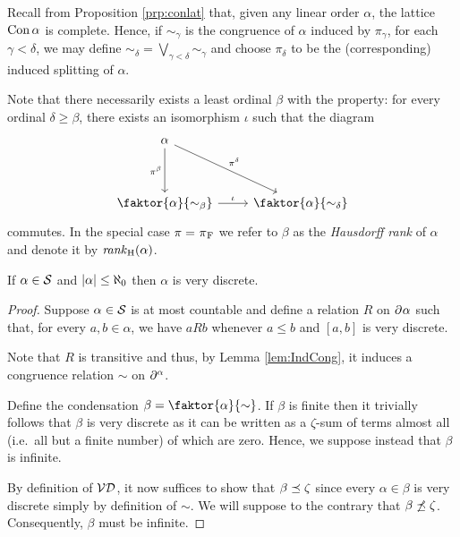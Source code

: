 Recall from Proposition \ref{prp:conlat} that, given any linear order $\alpha$,
the lattice $\operatorname{Con}\alpha$ is complete.  Hence, if $\sim_\gamma$ is the congruence
of $\alpha$ induced by $\pi_\gamma$, for each $\gamma<\delta$, we may define
$\sim_\delta=\bigvee_{\gamma<\delta}\sim_\gamma$ and choose $\pi_\delta$ to be
the (corresponding) induced splitting of $\alpha$.

Note that there necessarily exists a least ordinal $\beta$ with the property:
for every ordinal $\delta\geq\beta$, there exists an isomorphism $\iota$ such
that the diagram
\begin{equation}
	\begin{tikzcd}
		\alpha\arrow[dd,"{\pi^\beta}"']\arrow[rdd,"{\pi^\delta}"]&\\
									 &\\
		\faktor{\alpha}{\sim_\beta}\arrow[r,"{\iota}"]&\faktor{\alpha}{\sim_\delta}
	\end{tikzcd}
\end{equation}
commutes.  In the special case $\pi=\prescript{}{}{\pi}_\mathrm{F}$ we refer to $\beta$ as the
\textit{Hausdorff rank} of $\alpha$ and denote it by $\mathit{rank}_\mathrm{H}(\alpha)$.

\begin{lem}\label{prp:sctvd}
	If $\alpha\in\mathcal{S}$ and $\left\lvert\alpha\right\rvert\leq\aleph_0$ then $\alpha$ is very discrete.
\end{lem}

\begin{proof}
	Suppose $\alpha\in\mathcal{S}$ is at most countable and define a relation $R$
	on $\partial^{}\alpha$ such that, for every $a,b\in\alpha$, we have $aRb$
	whenever $a\leq b$ and $[a,b]$ is very discrete.

	Note that $R$ is transitive and thus, by Lemma \ref{lem:IndCong}, it induces
	a congruence relation $\sim$ on $\partial^{\alpha}$.

	Define the condensation $\beta=\faktor{\alpha}{\sim}$.  If $\beta$ is finite
	then it trivially follows that $\beta$ is very discrete as it can be written
	as a $\zeta$-sum of terms almost all (i.e.\ all but a finite number) of
	which are zero.  Hence, we suppose instead that $\beta$ is infinite.

	By definition of $\mathcal{VD}$, it now suffices to show that $\beta\preceq\zeta$
	since every $\alpha\in\beta$ is very discrete simply by definition of
	$\sim$.  We will suppose to the contrary that $\beta\not\preceq\zeta$.
	Consequently, $\beta$ must be infinite.
\end{proof}

